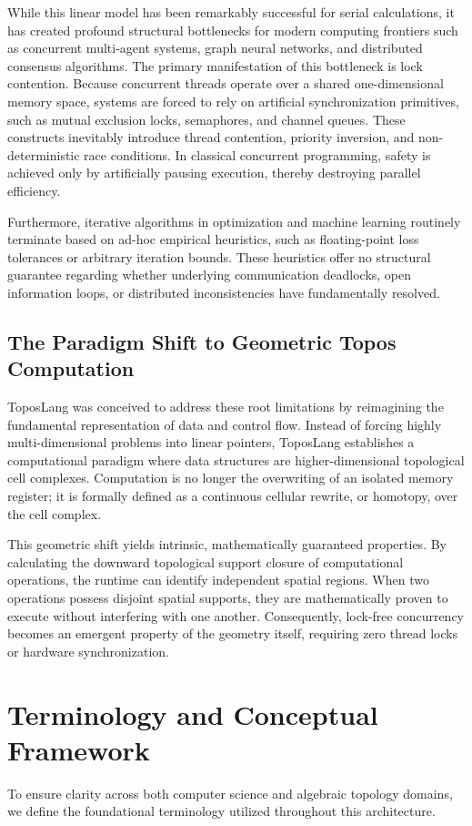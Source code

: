 \documentclass[11pt, a4paper]{article}
\begin{document}
While this linear model has been remarkably successful for serial calculations, it has created profound structural bottlenecks for modern computing frontiers such as concurrent multi-agent systems, graph neural networks, and distributed consensus algorithms. The primary manifestation of this bottleneck is lock contention. Because concurrent threads operate over a shared one-dimensional memory space, systems are forced to rely on artificial synchronization primitives, such as mutual exclusion locks, semaphores, and channel queues. These constructs inevitably introduce thread contention, priority inversion, and non-deterministic race conditions. In classical concurrent programming, safety is achieved only by artificially pausing execution, thereby destroying parallel efficiency.

Furthermore, iterative algorithms in optimization and machine learning routinely terminate based on ad-hoc empirical heuristics, such as floating-point loss tolerances or arbitrary iteration bounds. These heuristics offer no structural guarantee regarding whether underlying communication deadlocks, open information loops, or distributed inconsistencies have fundamentally resolved. 

\subsection{The Paradigm Shift to Geometric Topos Computation}
ToposLang was conceived to address these root limitations by reimagining the fundamental representation of data and control flow. Instead of forcing highly multi-dimensional problems into linear pointers, ToposLang establishes a computational paradigm where data structures are higher-dimensional topological cell complexes. Computation is no longer the overwriting of an isolated memory register; it is formally defined as a continuous cellular rewrite, or homotopy, over the cell complex.

This geometric shift yields intrinsic, mathematically guaranteed properties. By calculating the downward topological support closure of computational operations, the runtime can identify independent spatial regions. When two operations possess disjoint spatial supports, they are mathematically proven to execute without interfering with one another. Consequently, lock-free concurrency becomes an emergent property of the geometry itself, requiring zero thread locks or hardware synchronization.

\section{Terminology and Conceptual Framework}
To ensure clarity across both computer science and algebraic topology domains, we define the foundational terminology utilized throughout this architecture.
\end{document}

